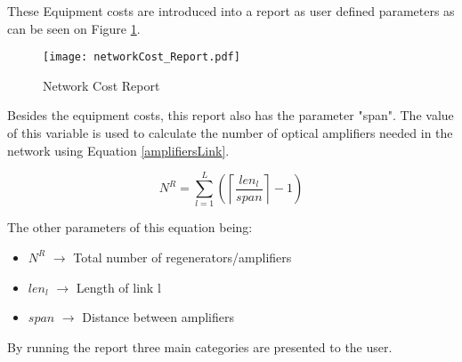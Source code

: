 	\begin{table} [h]
		\centering
		\caption{Equipment Costs}			
		\label{EquipmentCosts}			
	\end{table}
	
	These Equipment costs are introduced into a report as user defined parameters as can be seen on Figure \ref{networkCost_Report}.
	
	\begin{figure}[h!]
		\centering
		\texttt{[image: networkCost\_Report.pdf]}
		\caption{Network Cost Report}
		\label{networkCost_Report}
	\end{figure}	
	
	Besides the equipment costs, this report also has the parameter "span". The value of this variable is used to calculate the number of optical amplifiers needed in the network using Equation \ref{amplifiersLink}.
	
	\begin{equation}
		N^R = \sum\limits_{l=1}^L\left(\left\lceil\frac{len_l}{span}\right\rceil-1\right)
		\label{amplifiersLink}
	\end{equation}

	The other parameters of this equation being:
	
	\begin{itemize}
		\item{$N^R$			$\rightarrow$ Total number of regenerators/amplifiers}
		\item{$len_l$		$\rightarrow$ Length of link l}
		\item{$span$		$\rightarrow$ Distance between amplifiers}	
	\end{itemize}	
	
	By running the report three main categories are presented to the user.
	
